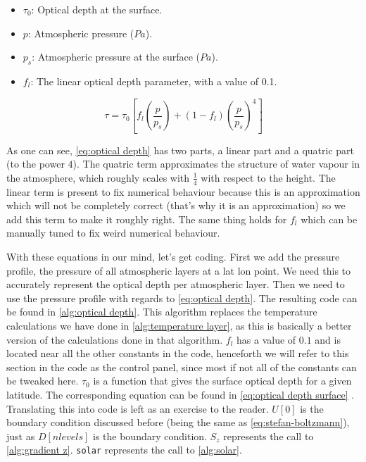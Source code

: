 \begin{itemize}
    \item $\tau_0$: Optical depth at the surface.
    \item $p$: Atmospheric pressure ($Pa$).
    \item $p_s$: Atmospheric pressure at the surface ($Pa$).
    \item $f_l$: The linear optical depth parameter, with a value of 0.1.
\end{itemize}

\begin{equation}
    \tau = \tau_0[f_l(\frac{p}{p_s}) + (1 - f_l)(\frac{p}{p_s})^4]
    \label{eq:optical depth}
\end{equation}

As one can see, \autoref{eq:optical depth} has two parts, a linear part and a quatric part (to the power $4$). The quatric term approximates the structure of water vapour in the atmosphere, which 
roughly scales with $\frac{1}{4}$ with respect to the height. The linear term is present to fix numerical behaviour because this is an approximation which will not be completely correct (that's
why it is an approximation) so we add this term to make it roughly right. The same thing holds for $f_l$ which can be manually tuned to fix weird numerical behaviour.

With these equations in our mind, let's get coding. First we add the pressure profile, the pressure of all atmospheric layers at a lat lon point. We need this to accurately represent the optical 
depth per atmospheric layer. Then we need to use the pressure profile with regards to \autoref{eq:optical depth}. The resulting code can be found in \autoref{alg:optical depth}. This algorithm 
replaces the temperature calculations we have done in \autoref{alg:temperature layer}, as this is basically a better version of the calculations done in that algorithm. $f_l$ has a value of $0.1$
and is located near all the other constants in the code, henceforth we will refer to this section in the code as the control panel, since most if not all of the constants can be tweaked here. 
$\tau_0$ is a function that gives the surface optical depth for a given latitude. The corresponding equation can be found in \autoref{eq:optical depth surface} \cite{simon}. Translating this 
into code is left as an exercise to the reader. $U[0]$ is the boundary condition discussed before (being the same as \autoref{eq:stefan-boltzmann}), just as $D[nlevels]$ is the boundary condition. 
$S_z$ represents the call to \autoref{alg:gradient z}. \texttt{solar} represents the call to \autoref{alg:solar}.

